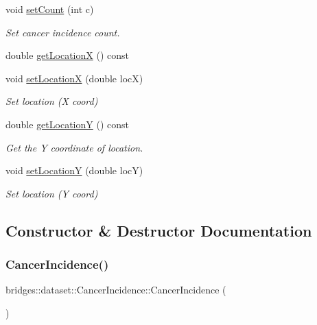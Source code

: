 \begin{DoxyCompactItemize}
void \mbox{\hyperlink{classbridges_1_1dataset_1_1_cancer_incidence_ac7083b46243f611392d33fc1c2dbce0d}{set\+Count}} (int c)
\begin{DoxyCompactList}\small\item\em Set cancer incidence count. \end{DoxyCompactList}\item 
double \mbox{\hyperlink{classbridges_1_1dataset_1_1_cancer_incidence_a982dc26b86ddeddf57d284b78dfd0752}{get\+LocationX}} () const
\item 
void \mbox{\hyperlink{classbridges_1_1dataset_1_1_cancer_incidence_af373c05a20c7a230f62be3ed53889787}{set\+LocationX}} (double locX)
\begin{DoxyCompactList}\small\item\em Set location (X coord) \end{DoxyCompactList}\item 
double \mbox{\hyperlink{classbridges_1_1dataset_1_1_cancer_incidence_af962caa4876c628cae5beaca9780650e}{get\+LocationY}} () const
\begin{DoxyCompactList}\small\item\em Get the Y coordinate of location. \end{DoxyCompactList}\item 
void \mbox{\hyperlink{classbridges_1_1dataset_1_1_cancer_incidence_ab18e0703f97909a0a37c5e9a3460736a}{set\+LocationY}} (double locY)
\begin{DoxyCompactList}\small\item\em Set location (Y coord) \end{DoxyCompactList}\end{DoxyCompactItemize}


\subsection{Constructor \& Destructor Documentation}
\mbox{\label{classbridges_1_1dataset_1_1_cancer_incidence_a2a6314af5704aa8f9f962738e12cd9dc}} 
\subsubsection{\texorpdfstring{Cancer\+Incidence()}{CancerIncidence()}}
{\footnotesize\ttfamily bridges\+::dataset\+::\+Cancer\+Incidence\+::\+Cancer\+Incidence (\begin{DoxyParamCaption}{ }\end{DoxyParamCaption})\hspace{0.3cm}{\ttfamily [inline]}}



